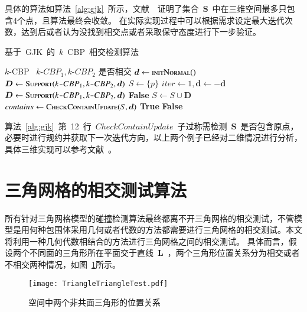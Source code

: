 具体的算法如算法~\ref{alg:gjk}~所示，文献~~证明了集合~$\bm{S}$~中在三维空间最多只包含4个点，且算法最终会收敛。
在实际实现过程中可以根据需求设定最大迭代次数，达到后或者认为没找到相交点或者采取保守态度进行下一步验证。

\begin{algorithm}[htb]
\small
\caption{基于~GJK~的~$k$~CBP~相交检测算法}
\label{alg:gjk}
\begin{algorithmic}[1]
\Require
$k$-CBP~ $k\texttt{-}CBP_1, k\texttt{-}CBP_2$
\Ensure
是否相交
    \State $\bm{d} \gets \Call{initNormal}$
    \State $\bm{D} \gets \Call{Support}{k\texttt{-}CBP_1, k\texttt{-}CBP_2, \bm{d}}$
    \State $S \gets \{p\}$
    \State $iter \gets 1 , \bm{d} \gets -\bm{d}$
        \State $\bm{D} \gets \Call{Support}{k\texttt{-}CBP_1, k\texttt{-}CBP_2, \bm{d}}$
            \State \Return \textbf{False}
        \EndIf
        \State $S \gets S \cup \bm{D}$
        \State $ contains \gets \Call{CheckContainUpdate}{S, \bm{d}}$ 
            \State \Return \textbf{True} 
        \EndIf
    \EndWhile
    \State \Return \textbf{False} 
\EndFunction
\end{algorithmic}
\end{algorithm}

算法~\ref{alg:gjk}~第~12~行~$CheckContainUpdate$~子过称需检测~$\bm{S}$~是否包含原点，必要时进行规约并获取下一次迭代方向，以上两个例子已经对二维情况进行分析，
具体三维实现可以参考文献~。


\section{三角网格的相交测试算法}
\label{sec:intersection:triangles}

所有针对三角网格模型的碰撞检测算法最终都离不开三角网格的相交测试，不管模型是用何种包围体采用几何或者代数的方法都需要进行三角网格的相交测试。本文将利用一种几何代数相结合的方法进行三角网格之间的相交测试。
具体而言，假设两个不同面的三角形所在平面交于直线~$\bm{L}$~，两个三角形位置关系分为相交或者不相交两种情况，如图~\ref{fig:two:triangle:ui}所示。

\begin{figure}[htb]
  \centering
    \texttt{[image: TriangleTriangleTest.pdf]}
    \caption{空间中两个非共面三角形的位置关系\cite{Moller1997}}
  \label{fig:two:triangle:ui}
\end{figure}

